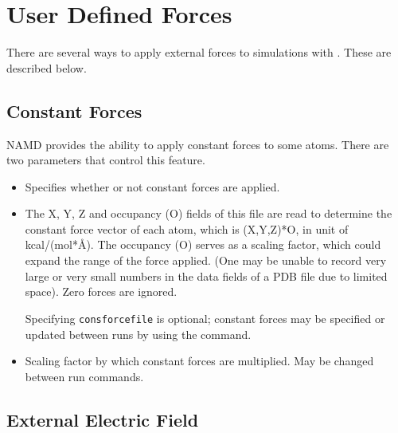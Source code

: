 
\section{User Defined Forces}
\label{section:userdef}



There are several ways to apply external forces to simulations with \NAMD.
These are described below.


\subsection{Constant Forces}

NAMD provides the ability to apply constant forces to some atoms.
There are two parameters that control this feature.

\begin{itemize}

\item
{}
{Specifies whether or not constant forces are applied.}

\item
{}
{
The X, Y, Z and occupancy (O) fields of this file are read to
determine the constant force vector of each atom, which is
(X,Y,Z)*O, in unit of kcal/(mol*\AA). The occupancy (O) serves as
a scaling factor, which could expand the range of the force
applied. (One may be unable to record very large or very small
numbers in the data fields of a PDB file due to limited space).
Zero forces are ignored.

Specifying {\tt consforcefile} is optional; constant forces may be specified
or updated between runs by using the  command.
}

\item
{}
{Scaling factor by which constant forces are multiplied.  May be changed between run commands.}

\end{itemize}


\subsection{External Electric Field}

